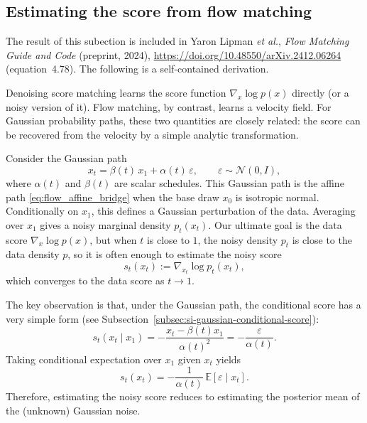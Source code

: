 \subsection{Estimating the score from flow matching}

The result of this subection is included in Yaron Lipman \emph{et al.}, \emph{Flow Matching Guide and Code} (preprint, 2024), \url{https://doi.org/10.48550/arXiv.2412.06264} (equation~4.78). The following is a self-contained derivation.

Denoising score matching learns the score function $\nabla_x \log p(x)$ directly (or a noisy version of it). Flow matching, by contrast, learns a velocity field. For Gaussian probability paths, these two quantities are closely related: the score can be recovered from the velocity by a simple analytic transformation.

Consider the Gaussian path
\begin{equation}
  x_t = \beta(t)\,x_1 + \alpha(t)\,\varepsilon,
  \qquad
  \varepsilon \sim \mathcal{N}(0,I),
  \label{eq:gaussian_prob_path}
\end{equation}
where $\alpha(t)$ and $\beta(t)$ are scalar schedules. This Gaussian path is the affine path \eqref{eq:flow_affine_bridge} when the base draw $x_0$ is isotropic normal. Conditionally on $x_1$, this defines a Gaussian perturbation of the data. Averaging over $x_1$ gives a noisy marginal density $p_t(x_t)$. Our ultimate goal is the data score $\nabla_x \log p(x)$, but when $t$ is close to $1$, the noisy density $p_t$ is close to the data density $p$, so it is often enough to estimate the noisy score
\[
s_t(x_t) := \nabla_{x_t}\log p_t(x_t),
\]
which converges to the data score as $t\to 1$.

The key observation is that, under the Gaussian path, the conditional score has a very simple form (see Subsection~\ref{subsec:si-gaussian-conditional-score}):
\begin{equation}
  s_t(x_t \mid x_1)
  =
  -\frac{x_t-\beta(t)x_1}{\alpha(t)^2}
  =
  -\frac{\varepsilon}{\alpha(t)}.
  \label{eq:conditional_score_simple}
\end{equation}
Taking conditional expectation over $x_1$ given $x_t$ yields
\begin{equation}
  s_t(x_t)
  =
  -\frac{1}{\alpha(t)}\,\mathbb{E}[\varepsilon \mid x_t].
  \label{eq:score_from_eps_mean}
\end{equation}
Therefore, estimating the noisy score reduces to estimating the posterior mean of the (unknown) Gaussian noise.

